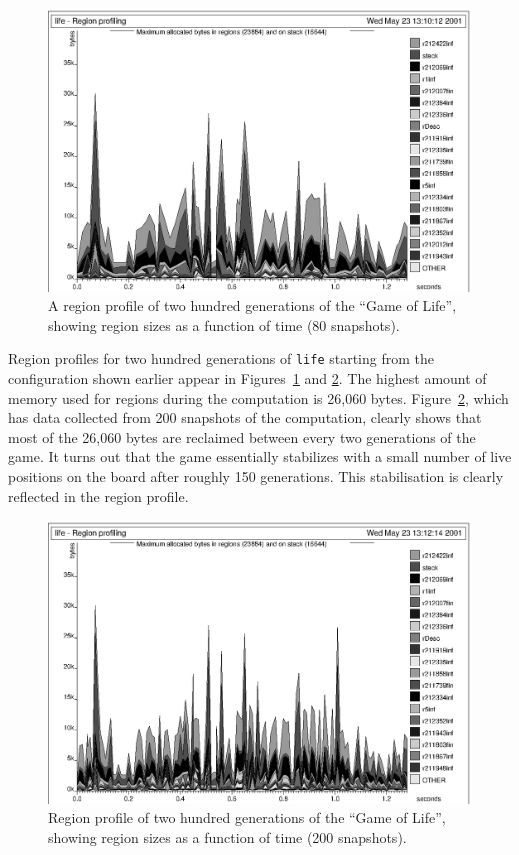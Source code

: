 \documentclass[12pt]{book}
\begin{document}
\begin{figure}
\begin{center}
\includegraphics{life80.ps}
\end{center}
\caption{A region profile of two hundred 
  generations of the ``Game of Life'', showing region sizes as a
  function of time (80 snapshots).}
\label{lifeprof80.fig}
\end{figure}

Region profiles for two hundred generations of {\tt life} starting
from the configuration shown earlier appear in
Figures~\ref{lifeprof80.fig} and \ref{lifeprof200.fig}.  The highest
amount of memory used for regions during the computation is 26,060
bytes. Figure~\ref{lifeprof200.fig}, which has data collected from 200
snapshots of the computation, clearly shows that most of the 26,060
bytes are reclaimed between every two generations of the game. It
turns out that the game essentially stabilizes with a small number of
live positions on the board after roughly 150 generations.  This
stabilisation is clearly reflected in the region profile.

\begin{figure}
\begin{center}
\includegraphics{life200.ps}
\end{center}
\caption{Region profile of two hundred 
  generations of the ``Game of Life'', showing region sizes as a
  function of time (200 snapshots).}
\label{lifeprof200.fig}
\end{figure}
\end{document}
